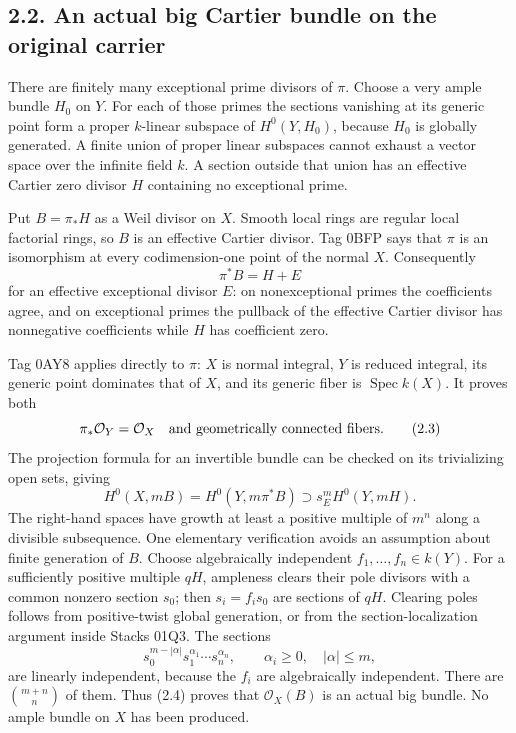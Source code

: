 \documentclass[
  10pt,
]{article}
\begin{document}
\subsection{2.2. An actual big Cartier bundle on the original
carrier}\label{an-actual-big-cartier-bundle-on-the-original-carrier}

There are finitely many exceptional prime divisors of \(\pi\). Choose a
very ample bundle \(H_0\) on \(Y\). For each of those primes the
sections vanishing at its generic point form a proper \(k\)-linear
subspace of \(H^0(Y,H_0)\), because \(H_0\) is globally generated. A
finite union of proper linear subspaces cannot exhaust a vector space
over the infinite field \(k\). A section outside that union has an
effective Cartier zero divisor \(H\) containing no exceptional prime.

Put \(B=\pi_*H\) as a Weil divisor on \(X\). Smooth local rings are
regular local factorial rings, so \(B\) is an effective Cartier divisor.
Tag 0BFP says that \(\pi\) is an isomorphism at every codimension-one
point of the normal \(X\). Consequently \[
 \pi^*B=H+E
 \tag{2.2}
\] for an effective exceptional divisor \(E\): on nonexceptional primes
the coefficients agree, and on exceptional primes the pullback of the
effective Cartier divisor has nonnegative coefficients while \(H\) has
coefficient zero.

Tag 0AY8 applies directly to \(\pi\): \(X\) is normal integral, \(Y\) is
reduced integral, its generic point dominates that of \(X\), and its
generic fiber is \(\operatorname{Spec}k(X)\). It proves both \[
 \pi_*\mathcal O_Y=\mathcal O_X
 \quad\hbox{and geometrically connected fibers.}
 \tag{2.3}
\] The projection formula for an invertible bundle can be checked on its
trivializing open sets, giving \[
 H^0(X,mB)=H^0(Y,m\pi^*B)\supset s_E^mH^0(Y,mH).
 \tag{2.4}
\] The right-hand spaces have growth at least a positive multiple of
\(m^n\) along a divisible subsequence. One elementary verification
avoids an assumption about finite generation of \(B\). Choose
algebraically independent \(f_1,\ldots,f_n\in k(Y)\). For a sufficiently
positive multiple \(qH\), ampleness clears their pole divisors with a
common nonzero section \(s_0\); then \(s_i=f_i s_0\) are sections of
\(qH\). Clearing poles follows from positive-twist global generation, or
from the section-localization argument inside Stacks 01Q3. The sections
\[
 s_0^{m-|\alpha|}s_1^{\alpha_1}\cdots s_n^{\alpha_n},
 \qquad \alpha_i\geq0,\quad |\alpha|\leq m,
\] are linearly independent, because the \(f_i\) are algebraically
independent. There are \(\binom{m+n}{n}\) of them. Thus (2.4) proves
that \(\mathcal O_X(B)\) is an actual big bundle. No ample bundle on
\(X\) has been produced.
\end{document}
